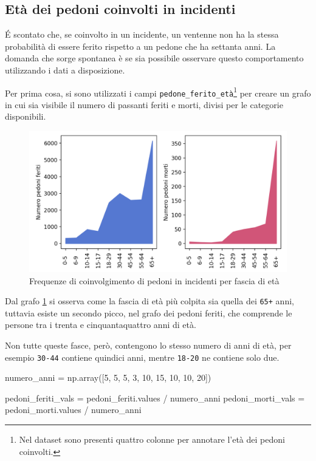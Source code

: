 \documentclass[a4paper,12pt]{report}
\newcommand{\columnstyle}[1]{\texttt{#1}}
\begin{document}
\subsection{Età dei pedoni coinvolti in incidenti}

\'E scontato che, se coinvolto in un incidente, un ventenne non ha la stessa 
probabilità di essere ferito rispetto a un pedone che ha settanta anni.
La domanda che sorge spontanea è se sia possibile osservare questo comportamento 
utilizzando i dati a disposizione.

Per prima cosa, si sono utilizzati i campi 
\columnstyle{pedone\_ferito\_età}\footnote{Nel dataset sono presenti quattro colonne per 
annotare l'età dei pedoni coinvolti.} 
per creare un grafo in cui sia visibile il numero di passanti feriti e morti, 
divisi per le categorie disponibili.

\begin{figure}
    \includegraphics[width=\linewidth]{../src/incidenti/incidenti_senza_coords/pedoni/eta_pedoni_iniziale.png}
    \caption{Frequenze di coinvolgimento di pedoni in incidenti per fascia di età}
    \label{fig:eta-pedoni-iniziale}
\end{figure}

Dal grafo \ref{fig:eta-pedoni-iniziale} si osserva come la fascia di età più colpita 
sia quella dei \columnstyle{65+} anni, tuttavia esiste un secondo picco, nel grafo dei 
pedoni feriti, che comprende le persone tra i trenta e cinquantaquattro anni di età.

Non tutte queste fasce, però, contengono lo stesso numero di anni di età, 
per esempio \columnstyle{30-44} contiene quindici anni, mentre 
\columnstyle{18-20} ne contiene solo due.

\begin{code}[language=Python]
numero_anni = np.array([5, 5, 5, 3, 10, 15, 10, 10, 20])

pedoni_feriti_vals = pedoni_feriti.values / numero_anni
pedoni_morti_vals = pedoni_morti.values / numero_anni
\end{code}
\end{document}
